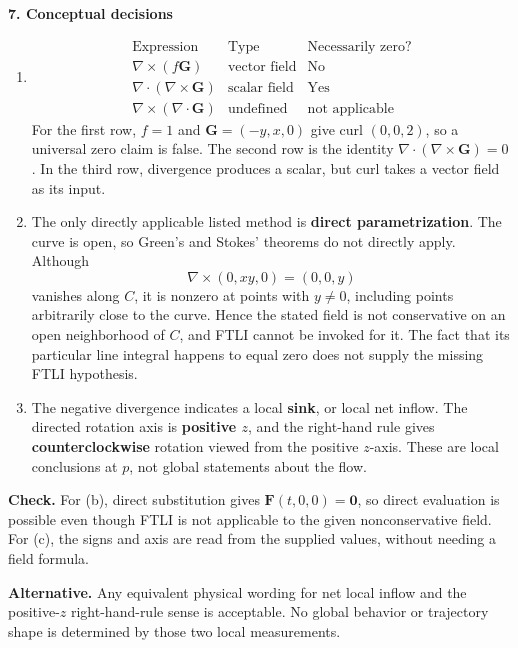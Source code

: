 \documentclass[11pt,letterpaper]{article}
\newcommand{\curl}{\nabla\times}
\newcommand{\dv}{\nabla\cdot}
\renewcommand{\vec}[1]{\mathbf{#1}}
\newcommand{\solutionproblem}[3]{%
  \par\bigskip\Needspace{7\baselineskip}
  \noindent\textbf{#1. #2}\par\nobreak
}
\newcommand{\verification}[1]{\par\textbf{Check.} #1\par}
\newcommand{\alternative}[1]{\par\textbf{Alternative.} #1\par}
\begin{document}
\solutionproblem{7}{Conceptual decisions}{14}
\begin{enumerate}[label=(\alph*)]
\item \[
\begin{array}{c|c|c}
\text{Expression}&\text{Type}&\text{Necessarily zero?}\\\hline
\curl(f\vec G)&\text{vector field}&\text{No}\\
\dv(\curl\vec G)&\text{scalar field}&\text{Yes}\\
\curl(\dv\vec G)&\text{undefined}&\text{not applicable}
\end{array}
\]
For the first row, $f=1$ and $\vec G=(-y,x,0)$ give curl $(0,0,2)$,
so a universal zero claim is false. The second row is the identity
$\dv(\curl\vec G)=0$. In the third row, divergence produces a scalar,
but curl takes a vector field as its input.

\item The only directly applicable listed method is
\textbf{direct parametrization}. The curve is open, so Green's and
Stokes' theorems do not directly apply. Although
\[
\curl(0,xy,0)=(0,0,y)
\]
vanishes along $C$, it is nonzero at points with $y\ne0$, including
points arbitrarily close to the curve. Hence the stated field is not
conservative on an open neighborhood of $C$, and FTLI cannot be invoked
for it. The fact that its particular line integral happens to equal zero
does not supply the missing FTLI hypothesis.

\item The negative divergence indicates a local
\textbf{sink}, or local net inflow. The directed rotation axis is
\textbf{positive $z$}, and the right-hand rule gives
\textbf{counterclockwise} rotation viewed from the positive $z$-axis.
These are local conclusions at $p$, not global statements about the flow.
\end{enumerate}
\verification{For (b), direct substitution gives $\vec F(t,0,0)=\vec0$,
so direct evaluation is possible even though FTLI is not applicable to
the given nonconservative field. For (c), the signs and axis are read
from the supplied values, without needing a field formula.}
\alternative{Any equivalent physical wording for net local inflow and
the positive-$z$ right-hand-rule sense is acceptable. No global behavior
or trajectory shape is determined by those two local measurements.}
\end{document}
